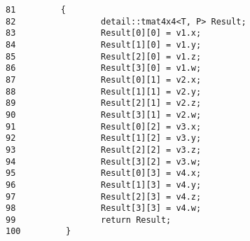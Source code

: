\begin{Code}\begin{verbatim}81         {
82                 detail::tmat4x4<T, P> Result;
83                 Result[0][0] = v1.x;
84                 Result[1][0] = v1.y;
85                 Result[2][0] = v1.z;
86                 Result[3][0] = v1.w;
87                 Result[0][1] = v2.x;
88                 Result[1][1] = v2.y;
89                 Result[2][1] = v2.z;
90                 Result[3][1] = v2.w;
91                 Result[0][2] = v3.x;
92                 Result[1][2] = v3.y;
93                 Result[2][2] = v3.z;
94                 Result[3][2] = v3.w;
95                 Result[0][3] = v4.x;
96                 Result[1][3] = v4.y;
97                 Result[2][3] = v4.z;
98                 Result[3][3] = v4.w;
99                 return Result;
100         }
\end{verbatim}
\end{Code}


